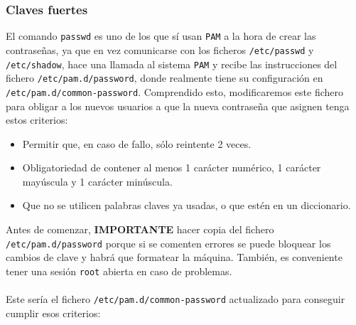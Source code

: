 \documentclass[10pt]{article}
\begin{document}
	\subsubsection{Claves fuertes}
	El comando \verb|passwd| es uno de los que sí usan \verb|PAM| a la hora de crear las contraseñas, ya que en vez comunicarse con los ficheros \verb|/etc/passwd| y \verb|/etc/shadow|, hace una llamada al sistema \verb|PAM| y recibe las instrucciones del fichero \verb|/etc/pam.d/password|, donde realmente tiene su configuración en \verb|/etc/pam.d/common-password|. Comprendido esto, modificaremos este fichero para obligar a los nuevos usuarios a que la nueva contraseña que asignen tenga estos criterios:
	\begin{itemize}
		\item Permitir que, en caso de fallo, sólo reintente 2 veces.
		\item Obligatoriedad de contener al menos 1 carácter numérico, 1 carácter mayúscula y 1 carácter minúscula.
		\item Que no se utilicen palabras claves ya usadas, o que estén en un diccionario.
	\end{itemize}
	Antes de comenzar, \textbf{IMPORTANTE} hacer copia del fichero \verb|/etc/pam.d/password| porque si se comenten errores se puede bloquear los cambios de clave y habrá que formatear la máquina. También, es conveniente tener una sesión \verb|root| abierta en caso de problemas.\\\\
	Este sería el fichero \verb|/etc/pam.d/common-password| actualizado para conseguir cumplir esos criterios:
\end{document}
